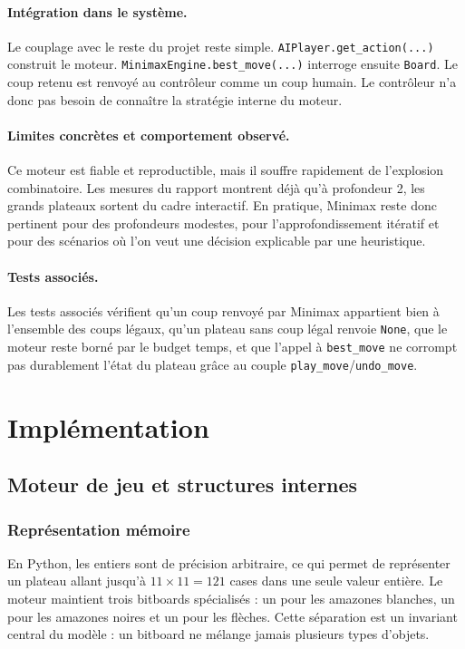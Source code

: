 \documentclass[a4paper]{article}
\begin{document}
\paragraph{Intégration dans le système.}
Le couplage avec le reste du projet reste simple. \texttt{AIPlayer.get\_action(...)} construit le moteur. \texttt{MinimaxEngine.best\_move(...)} interroge ensuite \texttt{Board}. Le coup retenu est renvoyé au contrôleur comme un coup humain. Le contrôleur n'a donc pas besoin de connaître la stratégie interne du moteur.

\paragraph{Limites concrètes et comportement observé.}
Ce moteur est fiable et reproductible, mais il souffre rapidement de l'explosion combinatoire. Les mesures du rapport montrent déjà qu'à profondeur 2, les grands plateaux sortent du cadre interactif. En pratique, Minimax reste donc pertinent pour des profondeurs modestes, pour l'approfondissement itératif et pour des scénarios où l'on veut une décision explicable par une heuristique.

\paragraph{Tests associés.}
Les tests associés vérifient qu'un coup renvoyé par Minimax appartient bien à l'ensemble des coups légaux, qu'un plateau sans coup légal renvoie \texttt{None}, que le moteur reste borné par le budget temps, et que l'appel à \texttt{best\_move} ne corrompt pas durablement l'état du plateau grâce au couple \texttt{play\_move}/\texttt{undo\_move}.

\section{Implémentation}

\subsection{Moteur de jeu et structures internes}

\subsubsection{Représentation mémoire}

En Python, les entiers sont de précision arbitraire, ce qui permet de représenter un plateau allant jusqu'à $11 \times 11 = 121$ cases dans une seule valeur entière. Le moteur maintient trois bitboards spécialisés : un pour les amazones blanches, un pour les amazones noires et un pour les flèches. Cette séparation est un invariant central du modèle : un bitboard ne mélange jamais plusieurs types d'objets.
\end{document}
